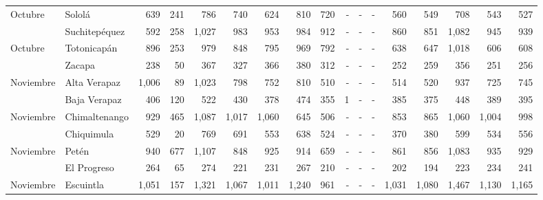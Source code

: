 \begin{landscape}
\begin{center}
\begin{longtable}{llrrrrrrrrrrrrrrr}
			\multicolumn{1}{l}{	\footnotesize	 Octubre 	}&	 Sololá 	&	 639 	&	 241 	&	 786 	&	 740 	&	 624 	&	 810 	&	 720 	&	 -   	&	 -   	&	 -   	&	 560 	&	 549 	&	 708 	&	 543 	&	 527 	\\
			\rowcolor{color1!5!white}\multicolumn{1}{l}{	\footnotesize	 Octubre 	}&	 Suchitepéquez 	&	 592 	&	 258 	&	 1,027 	&	 983 	&	 953 	&	 984 	&	 912 	&	 -   	&	 -   	&	 -   	&	 860 	&	 851 	&	 1,082 	&	 945 	&	 939 	\\
			\multicolumn{1}{l}{	\footnotesize	 Octubre 	}&	 Totonicapán 	&	 896 	&	 253 	&	 979 	&	 848 	&	 795 	&	 969 	&	 792 	&	 -   	&	 -   	&	 -   	&	 638 	&	 647 	&	 1,018 	&	 606 	&	 608 	\\
			\rowcolor{color1!5!white}\multicolumn{1}{l}{	\footnotesize	 Octubre 	}&	 Zacapa 	&	 238 	&	 50 	&	 367 	&	 327 	&	 366 	&	 380 	&	 312 	&	 -   	&	 -   	&	 -   	&	 252 	&	 259 	&	 356 	&	 251 	&	 256 	\\
			\multicolumn{1}{l}{	\footnotesize	 Noviembre 	}&	 Alta Verapaz 	&	 1,006 	&	 89 	&	 1,023 	&	 798 	&	 752 	&	 810 	&	 510 	&	 -   	&	 -   	&	 -   	&	 514 	&	 520 	&	 937 	&	 725 	&	 745 	\\
			\rowcolor{color1!5!white}\multicolumn{1}{l}{	\footnotesize	 Noviembre 	}&	 Baja Verapaz 	&	 406 	&	 120 	&	 522 	&	 430 	&	 378 	&	 474 	&	 355 	&	 1 	&	 -   	&	 -   	&	 385 	&	 375 	&	 448 	&	 389 	&	 395 	\\
			\multicolumn{1}{l}{	\footnotesize	 Noviembre 	}&	 Chimaltenango 	&	 929 	&	 465 	&	 1,087 	&	 1,017 	&	 1,060 	&	 645 	&	 506 	&	 -   	&	 -   	&	 -   	&	 853 	&	 865 	&	 1,060 	&	 1,004 	&	 998 	\\
			\rowcolor{color1!5!white}\multicolumn{1}{l}{	\footnotesize	 Noviembre 	}&	 Chiquimula 	&	 529 	&	 20 	&	 769 	&	 691 	&	 553 	&	 638 	&	 524 	&	 -   	&	 -   	&	 -   	&	 370 	&	 380 	&	 599 	&	 534 	&	 556 	\\
			\multicolumn{1}{l}{	\footnotesize	 Noviembre 	}&	 Petén 	&	 940 	&	 677 	&	 1,107 	&	 848 	&	 925 	&	 914 	&	 659 	&	 -   	&	 -   	&	 -   	&	 861 	&	 856 	&	 1,083 	&	 935 	&	 929 	\\
			\rowcolor{color1!5!white}\multicolumn{1}{l}{	\footnotesize	 Noviembre 	}&	 El Progreso 	&	 264 	&	 65 	&	 274 	&	 221 	&	 231 	&	 267 	&	 210 	&	 -   	&	 -   	&	 -   	&	 202 	&	 194 	&	 223 	&	 234 	&	 241 	\\
			\multicolumn{1}{l}{	\footnotesize	 Noviembre 	}&	 Escuintla 	&	 1,051 	&	 157 	&	 1,321 	&	 1,067 	&	 1,011 	&	 1,240 	&	 961 	&	 -   	&	 -   	&	 -   	&	 1,031 	&	 1,080 	&	 1,467 	&	 1,130 	&	 1,165 	\\

\end{longtable}
\end{center}
\end{landscape}
